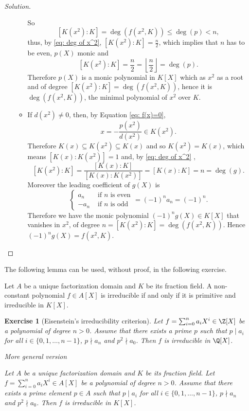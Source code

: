 \documentclass[a4paper,10pt,reqno]{amsart}
\newtheorem{ex}{Exercise}[section]
\newenvironment{sol}
  {\renewcommand\qedsymbol{$\blacksquare$}\begin{proof}[Solution]}
  {\end{proof}}
\begin{document}
\begin{sol}
\begin{enumerate}[label=(\roman*)]
\begin{itemize}
        So 
        \[
        [K(x^2):K]=\deg(f(x^2,K))\leq \deg(p)< n,
        \]
        thus, by \eqref{eq: deg of x^2}, $[K(x^2):K]=\frac{n}{2}$, which implies that $n$ has to be even, $p(X)$ monic and 
        \[
        [K(x^2):K]=\frac{n}{2}=\left\lfloor \frac{n}{2}\right\rfloor=\deg(p).
        \]
        Therefore $p(X)$ is a monic polynomial in $K[X]$
        which as $x^2$ as a root and of degree $[K(x^2):K]=\deg(f(x^2,K))$,
        hence it is $\deg(f(x^2,K))$,
        the minimal polynomial of $x^2$ over $K$.
        \item If $d(x^2)\neq0$, then, by Equation \eqref{eq: f(x)=0}, 
        \[
        x=-\frac{p(x^2)}{d(x^2)}\in K(x^2).
        \]
        Therefore $K(x)\subseteq K(x^2)\subseteq K(x)$ and so $K(x^2)=K(x)$,
        which means $[K(x):K(x^2)]=1$ and, by \eqref{eq: deg of x^2} ,
        \[
        [K(x^2):K]=\frac{[K(x):K]}{[K(x):K(x^2)]}=[K(x):K]=n=\deg(g).
        \]
        Moreover the leading coefficient of $g(X)$ is
        \[
        \begin{cases}
        a_n &\text{ if }n\text{ is even}\\
        -a_n&\text{ if }n\text{ is odd}
        \end{cases}=(-1)^na_n=(-1)^n .
        \]
        Therefore we have the monic polynomial  
        $(-1)^ng(X)\in K[X]$ that vanishes in $x^2$,
        of degree $n=[K(x^2):K]=\deg(f(x^2,K))$. Hence $(-1)^ng(X)=f(x^2,K)$.\qedhere
    \end{itemize}
    \end{enumerate}
\end{sol}



The following lemma can be used, without proof, in the following exercise.

\begin{lem*}
    Let $A$ be a unique factorization domain and $K$ be its fraction field.
    A non-constant polynomial $f\in A[X]$ is irreducible if and only if it is primitive and irreducible in $K[X]$.
\end{lem*}

\begin{ex} [Eisenstein's irreducibility criterion]
\label{3.3}
    Let $f=\sum_{i=0}^n a_iX^i\in \Z[X]$ be a polynomial of degree $n>0$. 
    Assume that there exists a prime $p$ such that
    $p\mid a_i$ for all $i\in\{0,1,\dots,n-1\}$, $p\nmid a_n$ and
    $p^2\nmid a_0$. Then $f$ is irreducible in $\Q[X]$.

    \vspace{.5cm}
    
    \textit{More general version}
    
    Let $A$ be a unique factorization domain and $K$ be its fraction field.
    Let $f=\sum_{i=0}^n a_iX^i\in A[X]$ be a polynomial of degree $n>0$. 
    Assume that there exists a prime element $p\in A$ such that
    $p\mid a_i$ for all $i\in\{0,1,\dots,n-1\}$, $p\nmid a_n$ and
    $p^2\nmid a_0$. Then $f$ is irreducible in $K[X]$. 
\end{ex}
\end{document}
